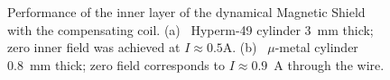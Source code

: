 \documentclass[12pt]{article}
\begin{document}
\begin{figure}[ht]%
\centering
{}
\qquad
{}
\caption{\small{Performance of the inner layer of the dynamical  Magnetic Shield
with the compensating coil.
(a)~ Hyperm-49 cylinder 3~mm thick; zero inner field was  achieved at $I\approx0.5$A. 
(b)~ $\mu$-metal cylinder 0.8~mm thick; zero  field  corresponds to  $I\approx0.9$~A 
through the wire.}
\label{innergauss}}
\end{figure}
\end{document}

